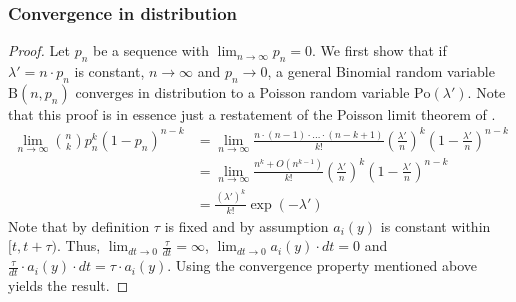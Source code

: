 \subsubsection{Convergence in distribution}
\label{A:convergence_distribution}
\Poisson*
\begin{proof}
Let $p_n$ be a sequence with $\lim_{n \to \infty} p_n = 0$. We first show that if $\lambda'=n \cdot p_n$ is constant, $n \to \infty$ and $p_n \to 0$, a general Binomial random variable $\textrm{B}(n, p_n)$ converges in distribution to a Poisson random variable $\textrm{Po}(\lambda')$. Note that this proof is in essence just a restatement of the Poisson limit theorem of \cite{Poisson.1835}.
\begin{align*}
\lim_{n \to \infty} \binom{n}{k} p^k_n (1-p_n)^{n-k} &= \lim_{n \to \infty} \frac{n \cdot (n-1) \cdot \hdots \cdot (n-k+1)}{k!} \left(\frac{\lambda'}{n} \right)^k \left(1-\frac{\lambda'}{n} \right)^{n-k} \\
&= \lim_{n \to \infty} \frac{n^k + O(n^{k-1})}{k!} \left(\frac{\lambda'}{n} \right)^k \left(1-\frac{\lambda'}{n} \right)^{n-k} \\
&= \frac{\left(\lambda'\right)^k}{k!} \exp{(-\lambda')}
\end{align*}
Note that by definition $\tau$ is fixed and by assumption $a_i(y)$ is constant within $[t, t+\tau)$. Thus, $\lim_{dt \to 0} \frac{\tau}{dt} = \infty$, $\lim_{dt \to 0} a_i(y) \cdot dt = 0$ and $\frac{\tau}{dt} \cdot a_i(y) \cdot dt = \tau \cdot a_i(y)$. Using the convergence property mentioned above yields the result.
\end{proof}


